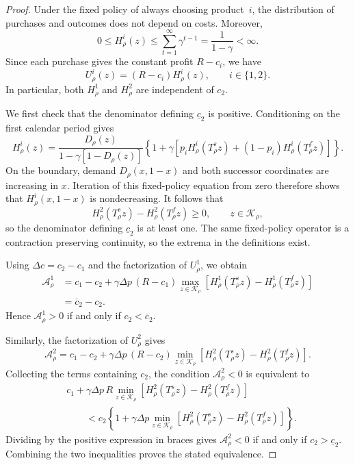\documentclass[11pt]{article}
\begin{document}
\begin{proof}
Under the fixed policy of always choosing product~$i$, the distribution
of purchases and outcomes does not depend on costs. Moreover,
\begin{equation*}
0\leq H_\rho^i(z)
\leq\sum_{t=1}^{\infty}\gamma^{t-1}
=\frac{1}{1-\gamma}<\infty.
\end{equation*}
Since each purchase gives the constant profit $R-c_i$, we have
\begin{equation*}
U_\rho^i(z)=(R-c_i)H_\rho^i(z),\qquad i\in\{1,2\}.
\end{equation*}
In particular, both $H_\rho^1$ and $H_\rho^2$ are independent of $c_2$.

We first check that the denominator defining $\underline c_2$ is
positive. Conditioning on the first calendar period gives
\begin{equation*}
H_\rho^i(z)
=\frac{D_\rho(z)}{1-\gamma[1-D_\rho(z)]}
\left\{1+\gamma\left[p_iH_\rho^i(T_\rho^s z)
+(1-p_i)H_\rho^i(T_\rho^f z)\right]\right\}.
\end{equation*}
On the boundary, demand $D_\rho(x,1-x)$ and both successor coordinates
are increasing in $x$. Iteration of this fixed-policy equation from
zero therefore shows that $H_\rho^i(x,1-x)$ is nondecreasing.
It follows that
\begin{equation*}
H_\rho^2(T_\rho^s z)-H_\rho^2(T_\rho^f z)\geq0,
\qquad z\in\mathcal K_\rho,
\end{equation*}
so the denominator defining $\underline c_2$ is at least one.
The same fixed-policy operator is a contraction preserving
continuity, so the extrema in the definitions exist.

Using $\Delta c=c_2-c_1$ and the factorization of $U_\rho^1$, we obtain
\begin{align*}
\mathcal A_\rho^1
&=c_1-c_2+\gamma\Delta p\,(R-c_1)
\max_{z\in\mathcal K_\rho}
\left[H_\rho^1(T_\rho^s z)-H_\rho^1(T_\rho^f z)\right]\\
&=\overline c_2-c_2.
\end{align*}
Hence $\mathcal A_\rho^1>0$ if and only if $c_2<\overline c_2$.

Similarly, the factorization of $U_\rho^2$ gives
\begin{equation*}
\mathcal A_\rho^2
=c_1-c_2+\gamma\Delta p\,(R-c_2)
\min_{z\in\mathcal K_\rho}
\left[H_\rho^2(T_\rho^s z)-H_\rho^2(T_\rho^f z)\right].
\end{equation*}
Collecting the terms containing $c_2$, the condition
$\mathcal A_\rho^2<0$ is equivalent to
\begin{align*}
&c_1+\gamma\Delta p\,R
\min_{z\in\mathcal K_\rho}
\left[H_\rho^2(T_\rho^s z)-H_\rho^2(T_\rho^f z)\right]\\
&\qquad<c_2\left\{1+\gamma\Delta p
\min_{z\in\mathcal K_\rho}
\left[H_\rho^2(T_\rho^s z)-H_\rho^2(T_\rho^f z)\right]\right\}.
\end{align*}
Dividing by the positive expression in braces gives
$\mathcal A_\rho^2<0$ if and only if $c_2>\underline c_2$.
Combining the two inequalities proves the stated equivalence.


\end{proof}
\end{document}
